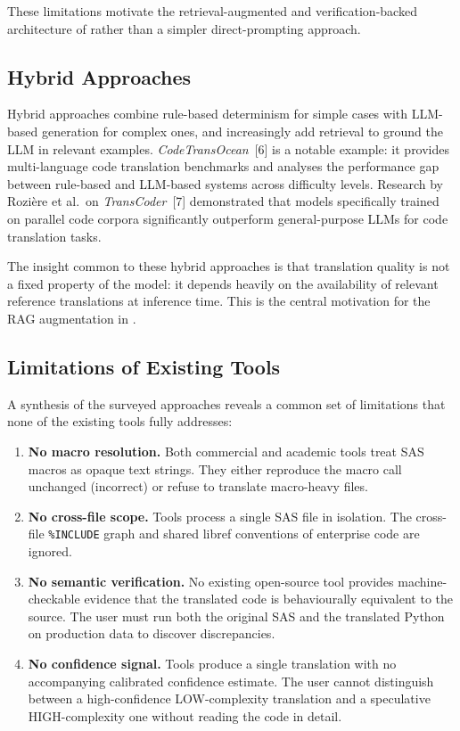 These limitations motivate the retrieval-augmented and verification-backed
architecture of \codara{} rather than a simpler direct-prompting approach.

\subsection{Hybrid Approaches}
\label{subsec:hybrid-translation}

Hybrid approaches combine rule-based determinism for simple cases with
\ac{LLM}-based generation for complex ones, and increasingly add retrieval
to ground the \ac{LLM} in relevant examples. \textit{CodeTransOcean}~[6] is
a notable example: it provides multi-language code translation benchmarks and
analyses the performance gap between rule-based and \ac{LLM}-based systems
across difficulty levels. Research by Rozière et al.\ on
\textit{TransCoder}~[7] demonstrated that models specifically trained on
parallel code corpora significantly outperform general-purpose \acp{LLM} for
code translation tasks.

The insight common to these hybrid approaches is that translation quality is
not a fixed property of the model: it depends heavily on the availability of
relevant reference translations at inference time. This is the central
motivation for the \ac{RAG} augmentation in \codara{}.

\subsection{Limitations of Existing Tools}
\label{subsec:existing-limitations}

A synthesis of the surveyed approaches reveals a common set of limitations
that none of the existing tools fully addresses:

\begin{enumerate}
  \item \textbf{No macro resolution.} Both commercial and academic tools treat
    SAS macros as opaque text strings. They either reproduce the macro call
    unchanged (incorrect) or refuse to translate macro-heavy files.
  \item \textbf{No cross-file scope.} Tools process a single SAS file in
    isolation. The cross-file \texttt{\%INCLUDE} graph and shared libref
    conventions of enterprise code are ignored.
  \item \textbf{No semantic verification.} No existing open-source tool
    provides machine-checkable evidence that the translated code is
    behaviourally equivalent to the source. The user must run both the
    original SAS and the translated Python on production data to discover
    discrepancies.
  \item \textbf{No confidence signal.} Tools produce a single translation with
    no accompanying calibrated confidence estimate. The user cannot distinguish
    between a high-confidence LOW-complexity translation and a speculative
    HIGH-complexity one without reading the code in detail.
\end{enumerate}

